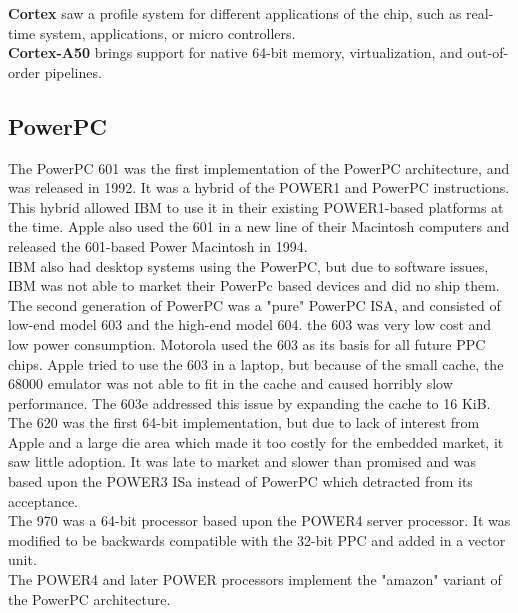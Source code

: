 \documentclass[letterpaper,10pt,titlepage]{article}
\begin{document}
\textbf{Cortex} saw a profile system for different applications of the chip, such as real-time system, applications, or micro controllers.\\

\textbf{Cortex-A50} brings support for native 64-bit memory, virtualization, and out-of-order pipelines.

\subsection{PowerPC}\cite{IBM2}

The PowerPC 601 was the first implementation of the PowerPC architecture, and was released in 1992. It was a hybrid of the POWER1 and PowerPC instructions. This hybrid allowed IBM to use it in their existing POWER1-based platforms at the time. Apple also used the 601 in a new line of their Macintosh computers and released the 601-based Power Macintosh in 1994.\\

IBM also had desktop systems using the PowerPC, but due to software issues, IBM was not able to market their PowerPc based devices and did no ship them.\\

The second generation of PowerPC was a "pure" PowerPC ISA, and consisted of low-end model 603 and the high-end model 604. the 603 was very low cost and low power consumption. Motorola used the 603 as its basis for all future PPC chips. Apple tried to use the 603 in a laptop, but because of the small cache, the 68000 emulator was not able to fit in the cache and caused horribly slow performance. The 603e addressed this issue by expanding the cache to 16 KiB.\\

The 620 was the first 64-bit implementation, but due to lack of interest from Apple and a large die area which made it too costly for the embedded market, it saw little adoption. It was late to market and slower than promised and was based upon the POWER3 ISa instead of PowerPC which detracted from its acceptance.\\

The 970 was a 64-bit processor based upon the POWER4 server processor. It was modified to be backwards compatible with the 32-bit PPC and added in a vector unit.\\

The POWER4 and later POWER processors implement the "amazon" variant of the PowerPC architecture.\\
\end{document}
